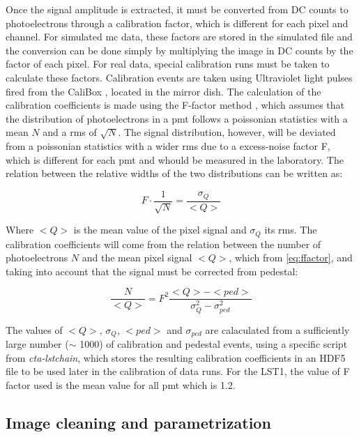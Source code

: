 \documentclass[main.tex]{subfiles}
\begin{document}
Once the signal amplitude is extracted, it must be converted from DC counts to photoelectrons through a calibration factor, which is different for each pixel and channel. For simulated \gls{mc} data, these factors are stored in the simulated file and the conversion can be done simply by multiplying the image in DC counts by the factor of each pixel. For real data, special calibration runs must be taken to calculate these factors. Calibration events are taken using Ultraviolet light pulses fired from the CaliBox \cite{2015CaliBox}, \cite{2019CaliBox} located in the mirror dish. The calculation of the calibration coefficients is made using the F-factor method \cite{1997calibrationPMT}, which assumes that the distribution of photoelectrons in a \gls{pmt} follows a poissonian statistics with a mean $N$ and a \gls{rms} of $\sqrt{N}$. The signal distribution, however, will be deviated from a poissonian statistics with a wider \gls{rms} due to a excess-noise factor F, which is different for each \gls{pmt} and whould be measured in the laboratory. The relation between the relative widths of the two distributions can be written as:

\begin{equation}
  F \cdot \frac{1}{\sqrt{N}} = \frac{\sigma_{Q}}{<Q>}
  \label{eq:ffactor}
\end{equation} 

Where $<Q>$ is the mean value of the pixel signal and $\sigma_{Q}$ its \gls{rms}. The calibration coefficients will come from the relation between the number of photoelectrons $N$ and the mean pixel signal $<Q>$, which from \ref{eq:ffactor}, and taking into account that the signal must be corrected from pedestal:

\begin{equation}
  \frac{N}{<Q>} = F^{2}\frac{<Q> - <ped>}{\sigma_{Q}^{2} - \sigma_{ped}^{2}}
\end{equation}

The values of $<Q>$, $\sigma_{Q}$, $<ped>$ and $\sigma_{ped}$ are calaculated from a sufficiently large number ($\sim$ 1000) of calibration and pedestal events, using a specific script from \textit{cta-lstchain}, which stores the resulting calibration coefficients in an HDF5 file to be used later in the calibration of data runs. For the LST1, the value of F factor used is the mean value for all \gls{pmt} which is 1.2.

\subsection{Image cleaning and parametrization}
\end{document}
